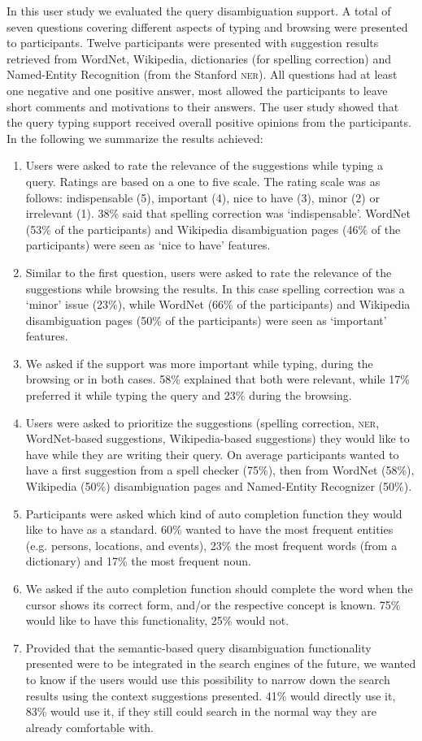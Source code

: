 \documentclass[output=paper]{LSP/langsci}
\begin{document}
In this user study we evaluated the query disambiguation support. A total of seven questions covering different aspects of typing and browsing were presented to participants.
Twelve participants were presented with suggestion results retrieved from WordNet, Wikipedia, dictionaries (for spelling correction) and Named-Entity Recognition (from the Stanford \textsc{ner}). All questions had at least one negative and one positive answer, most allowed the participants to leave short comments and motivations to their answers. The user study showed that the query typing support received overall positive opinions from the participants. In the following we summarize the results achieved:
\begin{enumerate}\sloppy
	\item Users were asked to rate the relevance of the suggestions while typing a query. Ratings are based on a one to five scale. The rating scale was as follows: indispensable (5), important (4), nice to have (3), minor (2) or irrelevant (1).  38\% said that spelling correction was `indispensable'. WordNet (53\% of the participants) and Wikipedia disambiguation pages (46\% of the participants) were seen as `nice to have' features.
	\item Similar to the first question, users were asked to rate the relevance of the suggestions while browsing the results. In this case spelling correction was a `minor' issue (23\%), while WordNet (66\% of the participants) and Wikipedia disambiguation pages (50\% of the participants) were seen as `important' features.
	\item We asked if the support was more important while typing, during the browsing or in both cases. 58\% explained that both were relevant, while 17\% preferred it while typing the query and 23\% during the browsing.
	\item Users were asked to prioritize the suggestions (spelling correction, \textsc{ner}, WordNet-based suggestions, Wikipedia-based suggestions) they would like to have while they are writing their query. On average participants wanted to have a first suggestion from a spell checker (75\%), then from WordNet (58\%), Wikipedia (50\%) disambiguation pages and Named-Entity Recognizer (50\%).
	\item Participants were asked which kind of auto completion function they would like to have as a standard. 60\% wanted to have the most frequent entities (e.g. persons, locations, and events), 23\% the most frequent words (from a dictionary) and 17\% the most frequent noun.
	\item We asked if the auto completion function should complete the word when the cursor shows its correct form, and/or the respective concept is known.  75\% would like to have this functionality, 25\% would not.
	\item Provided that the semantic-based query disambiguation functionality presented were to be integrated in the search engines of the future, we wanted to know if the users would use this possibility to narrow down the search results using the context suggestions presented. 41\% would directly use it, 83\% would use it, if they still could search in the normal way they are already comfortable with.
\end{enumerate} 
\end{document}

